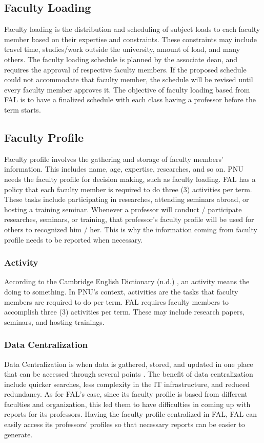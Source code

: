 \subsection{Faculty Loading}
Faculty loading is the distribution and scheduling of subject loads to each faculty member based on their expertise and constraints. These constraints may include travel time, studies/work outside the university, amount of load, and many others. The faculty loading schedule is planned by the associate dean, and requires the approval of respective faculty members. If the proposed schedule could not accommodate that faculty member, the schedule will be revised until every faculty member approves it. The objective of faculty loading based from FAL is to have a finalized schedule with each class having a professor before the term starts.

\subsection{Faculty Profile}
Faculty profile involves the gathering and storage of faculty members' information. This includes name, age, expertise, researches, and so on. PNU needs the faculty profile for decision making, such as faculty loading. FAL has a policy that each faculty member is required to do three (3) activities per term. These tasks include participating in researches, attending seminars abroad, or hosting a training seminar. Whenever a professor will conduct / participate researches, seminars, or training, that professor's faculty profile will be used for others to recognized him / her. This is why the information coming from faculty profile needs to be reported when necessary.

\subsubsection{Activity}
According to the Cambridge English Dictionary (n.d.) \nocite{ref:Activity}, an activity means the doing to something. In PNU's context, activities are the tasks that faculty members are required to do per term. FAL requires faculty members to accomplish three (3) activities per term. These may include research papers, seminars, and hosting trainings.

\subsubsection{Data Centralization}
Data Centralization is when data is gathered, stored, and updated in one place that can be accessed through several points \cite{ref:DataCentralization}. The benefit of data centralization include quicker searches, less complexity in the IT infrastructure, and reduced redundancy. As for FAL's case, since its faculty profile is based from different faculties and organization, this led them to have difficulties in coming up with reports for its professors. Having the faculty profile centralized in FAL, FAL can easily access its professors' profiles so that necessary reports can be easier to generate.

